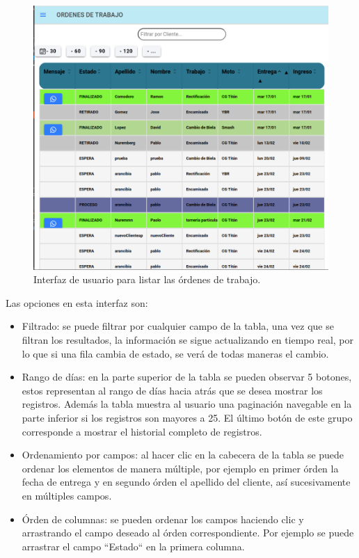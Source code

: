 \begin{figure}[H]
	\centering
	\includegraphics[scale=.30]{./Figures/listado-1.png}
	\caption{Interfaz de usuario para listar las órdenes de trabajo.}
	\label{fig:listado1}
\end{figure}

Las opciones en esta interfaz son:

\begin{itemize}
\item Filtrado: se puede filtrar por cualquier campo de la tabla, una vez que se filtran los resultados, la información se sigue actualizando en tiempo real, por lo que si una fila cambia de estado, se verá de todas maneras el cambio.

\item Rango de días: en la parte superior de la tabla se pueden observar 5 botones, estos representan al rango de días hacia atrás que se desea mostrar los registros. Además la tabla muestra al usuario una paginación navegable en la parte inferior si los registros son mayores a 25. El último botón de este grupo corresponde a mostrar el historial completo de registros.

\item Ordenamiento por campos: al hacer clic en la cabecera de la tabla se puede ordenar los elementos de manera múltiple, por ejemplo en primer órden la fecha de entrega y en segundo órden el apellido del cliente, así sucesivamente en múltiples campos.

\item Órden de columnas: se pueden ordenar los campos haciendo clic y arrastrando el campo deseado al órden correspondiente. Por ejemplo se puede arrastrar el campo ``Estado`` en la primera columna.
\end{itemize}

